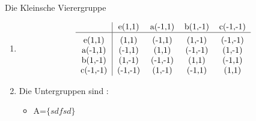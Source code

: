 \documentclass{homework}
\begin{document}
\begin{problem}
    Die Kleinsche Vierergruppe
\end{problem}

\begin{solution}
    \begin{enumerate}[label=\alph*)]
        \item \[
            \begin{tabular}{c |c c c c}
            ~   & e(1,1)   & a(-1,1)  & b(1,-1)  & c(-1,-1)  \\
            \hline\vrule height 12pt width 0pt
            e(1,1)   & (1,1)   & (-1,1)   & (1,-1)   & (-1,-1)  \\
            a(-1,1)   & (-1,1)   & (1,1)   & (-1,-1)   & (1,-1)  \\
            b(1,-1)   & (1,-1)   & (-1,-1)   & (1,1)   & (-1,1)  \\
            c(-1,-1)   & (-1,-1)   & (1,-1)   & (-1,1)   & (1,1)  \\
            \end{tabular}
        \]
        \item Die Untergruppen sind :
        \begin{itemize}
            \item A=$\{sdfsd\}$
        \end{itemize}
    \end{enumerate}
\end{solution}
\end{document}
